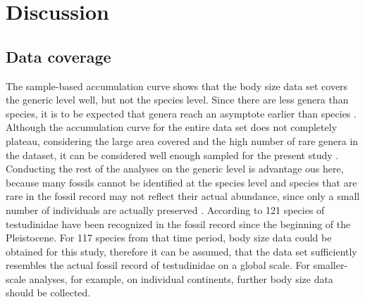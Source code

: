 \section{Discussion}

\subsection{Data coverage}
The sample-based accumulation curve shows that the body size data set covers the generic level well, but not the species level.
Since there are less genera than species, it is to be expected that genera reach an asymptote earlier than species \citep{Gotelli2001}.
Although the accumulation curve for the entire data set does not completely plateau, considering the large area covered \citep{Thompson2002} and the high number of rare genera in the dataset, it can be considered well enough sampled for the present study \citep{Gotelli2001}.
Conducting the rest of the analyses on the generic level is advantage ous here, because many fossils cannot be identified at the species level and species that are rare in the fossil record may not reflect their actual abundance, since only a small number of individuals are actually preserved \citep{Jass2014}.
According to \cite{Rhodin2015} 121 species of testudinidae have been recognized in the fossil record since the beginning of the Pleistocene. For 117 species from that time period, body size data could be obtained for this study, therefore it can be assumed, that the data set sufficiently resembles the actual fossil record of testudinidae on a global scale.
For smaller-scale analyses, for example, on individual continents, further body size data should be collected.



%

